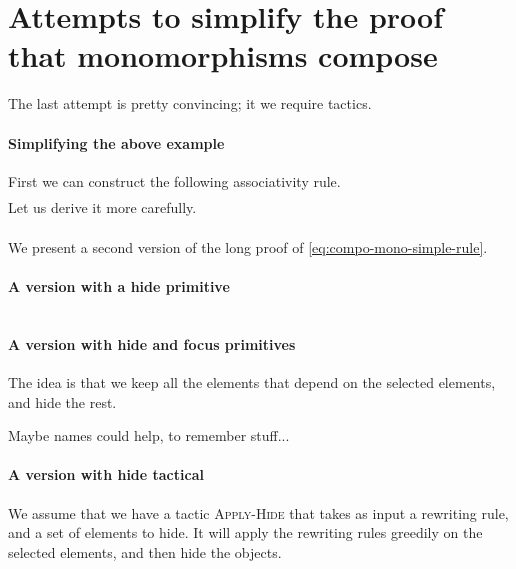 \documentclass{article}
\begin{document}
\section{Attempts to simplify the proof that monomorphisms compose}
The last attempt is pretty convincing; it we require tactics.
\label{app:simplified-proof}
\paragraph{Simplifying the above example}
First we can construct the following associativity rule.
\begin{align}
    
    \tag{Comp-Assoc}
    \label{eq:comp-assoc}
\end{align}
Let us derive it more carefully.
\begin{align*}
    
\end{align*}

We present a second version of the long proof of \eqref{eq:compo-mono-simple-rule}.
\pagebreak
\[

\]
\paragraph{A version with a hide primitive}
\pagebreak
\[

\]
\paragraph{A version with hide and focus primitives}
The idea is that we keep all the elements that depend on the selected elements, and hide the rest.
\pagebreak
\[

\]


Maybe names could help, to remember stuff...
\paragraph{A version with hide tactical}
We assume that we have a tactic \textsc{Apply-Hide} that takes as input 
a rewriting rule, and a set of elements to hide.
It will apply the rewriting rules greedily on the selected elements,
and then hide the objects.
\[

\]
\end{document}
